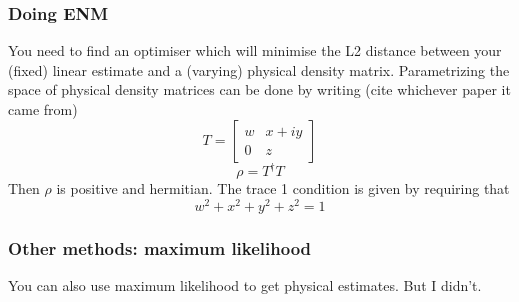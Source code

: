 \documentclass{beamer}
\begin{document}
\begin{frame}
  \frametitle{Doing ENM}
  You need to find an optimiser which will minimise the L2 distance between your (fixed) linear estimate and a (varying) physical density matrix. Parametrizing the space of physical density matrices can be done by writing (cite whichever paper it came from)
  \begin{equation}
    T = \begin{bmatrix}w&x+iy\\0&z\end{bmatrix}
  \end{equation}
  \begin{equation}
    \rho = T^\dagger T
  \end{equation}
  Then $\rho$ is positive and hermitian. The trace 1 condition is given by requiring that
  \begin{equation}
    w^2+x^2+y^2+z^2=1
  \end{equation}
\end{frame}

\begin{frame}
  \frametitle{Other methods: maximum likelihood}
  You can also use maximum likelihood to get physical estimates. But I didn't.
\end{frame}
\end{document}
